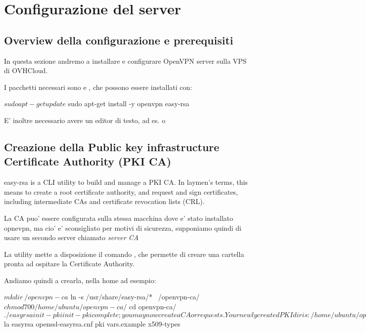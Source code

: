 \chapter{Configurazione del server}
\setlength{\parskip}{1em}
\setlength{\parindent}{0em}
\renewcommand{\baselinestretch}{1.15}

\label{ch:server}

\section{Overview della configurazione e prerequisiti}

In questa sezione andremo a installare e configurare OpenVPN server sulla VPS di OVHCloud.

I pacchetti necessari sono  e , che possono essere installati con:

\begin{bashcode}
$ sudo apt-get update
$ sudo apt-get install -y openvpn easy-rsa
\end{bashcode}

E' inoltre necessario avere un editor di testo, ad es.  o 

\section{Creazione della Public key infrastructure Certificate Authority (PKI CA)}



easy-rsa is a CLI utility to build and manage a PKI CA. In laymen's terms, this means to create a root certificate authority, and request and sign certificates, including intermediate CAs and certificate revocation lists (CRL).



La CA puo' essere configurata sulla stessa macchina dove e' stato installato opnevpn, ma cio' e' sconsigliato per motivi di sicurezza, supponiamo quindi di usare un secondo server chiamato \textit{server CA}

La utility  mette a disposizione il comando , che permette di creare una cartella pronta ad ospitare la Certificate Authority.

Andiamo quindi a crearla, nella home ad esempio:

\begin{bashcode}
$ mkdir ~/openvpn-ca
$ ln -s /usr/share/easy-rsa/* ~/openvpn-ca/
$ chmod 700 /home/ubuntu/openvpn-ca/
$ cd openvpn-ca/
$ ./easyrsa init-pki

init-pki complete; you may now create a CA or requests.
Your newly created PKI dir is: /home/ubuntu/openvpn-ca/pki

$ la
easyrsa  openssl-easyrsa.cnf  pki  vars.example  x509-types
\end{bashcode}

